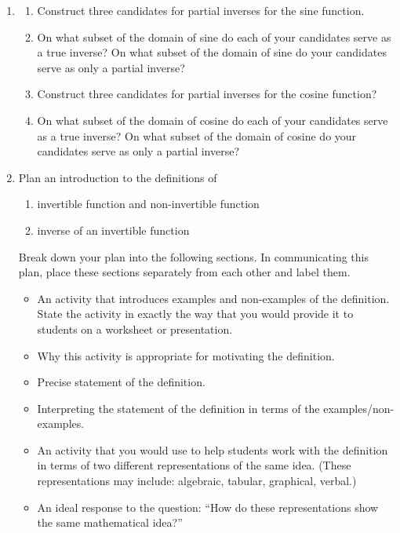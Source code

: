 \documentclass[11pt]{article}
\theoremstyle{definition}
\begin{document}
\begin{enumerate}[resume]
\item %
	\begin{enumerate}
	\item Construct three candidates for partial inverses for the sine function.
	\item On what subset of the domain of sine do each of your candidates serve as a true inverse? On what subset of the domain of sine do your candidates serve as only a partial inverse?
	\item Construct three candidates for partial inverses for the cosine function?
	\item On what subset of the domain of cosine do each of your candidates serve as a true inverse? On what subset of the domain of cosine do your candidates serve as only a partial inverse?
	\end{enumerate}
	
\item %
Plan an introduction to the definitions of 
	\begin{enumerate}
	\item invertible function and non-invertible function
	\item inverse of an invertible function
	\end{enumerate}
Break down your plan into the following sections. In communicating this plan, place these sections separately from each other and label them.
	\begin{itemize}
	\item An activity that introduces examples and non-examples of the definition. State the activity in exactly the way that you would provide it to students on a worksheet or presentation.
	\item Why this activity is appropriate for motivating the definition. 
	\item Precise statement of the definition.
	\item Interpreting the statement of the definition in terms of the examples/non-examples.
	\item An activity that you would use to help students work with the definition in terms of two different representations of the same idea. (These representations may include: algebraic, tabular, graphical, verbal.)
	\item An ideal response to the question: ``How do these representations show the same mathematical idea?'' 
	\end{itemize}


\end{enumerate}
\end{document}
